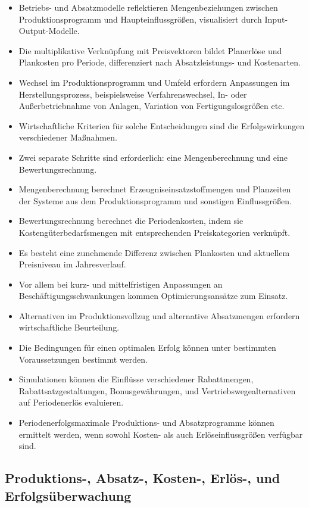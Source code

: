 \begin{itemize}
    \item Betriebs- und Absatzmodelle reflektieren Mengenbeziehungen zwischen Produktionsprogramm und Haupteinflussgrö{\ss}en, visualisiert durch Input-Output-Modelle.
    \item Die multiplikative Verknüpfung mit Preisvektoren bildet Planerlöse und Plankosten pro Periode, differenziert nach Absatzleistungs- und Kostenarten.
    \item Wechsel im Produktionsprogramm und Umfeld erfordern Anpassungen im Herstellungsprozess, beispielsweise Verfahrenswechsel, In- oder Au{\ss}erbetriebnahme von Anlagen, Variation von Fertigungslosgrö{\ss}en etc.
    \item Wirtschaftliche Kriterien für solche Entscheidungen sind die Erfolgswirkungen verschiedener Ma{\ss}nahmen.
    \item Zwei separate Schritte sind erforderlich: eine Mengenberechnung und eine Bewertungsrechnung.
    \item Mengenberechnung berechnet Erzeugniseinsatzstoffmengen und Planzeiten der Systeme aus dem Produktionsprogramm und sonstigen Einflussgrö{\ss}en.
    \item Bewertungsrechnung berechnet die Periodenkosten, indem sie Kostengüterbedarfsmengen mit entsprechenden Preiskategorien verknüpft.
    \item Es besteht eine zunehmende Differenz zwischen Plankosten und aktuellem Preisniveau im Jahresverlauf.
    \item Vor allem bei kurz- und mittelfristigen Anpassungen an Beschäftigungsschwankungen kommen Optimierungsansätze zum Einsatz.
    \item Alternativen im Produktionsvollzug und alternative Absatzmengen erfordern wirtschaftliche Beurteilung.
    \item Die Bedingungen für einen optimalen Erfolg können unter bestimmten Voraussetzungen bestimmt werden.
    \item Simulationen können die Einflüsse verschiedener Rabattmengen, Rabattsatzgestaltungen, Bonusgewährungen, und Vertriebswegealternativen auf Periodenerlös evaluieren.
    \item Periodenerfolgsmaximale Produktions- und Absatzprogramme können ermittelt werden, wenn sowohl Kosten- als auch Erlöseinflussgrö{\ss}en verfügbar sind.
\end{itemize}

\subsection{Produktions-, Absatz-, Kosten-, Erlös-, und Erfolgsüberwachung}

